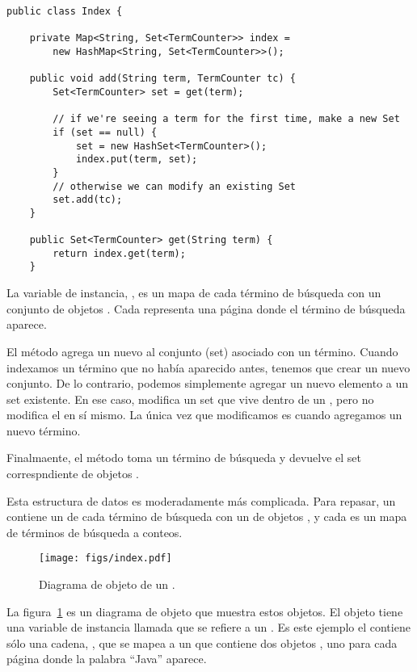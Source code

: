 \documentclass[12pt]{book}
\theoremstyle{exercise}
\begin{document}
\begin{verbatim}
public class Index {

    private Map<String, Set<TermCounter>> index = 
        new HashMap<String, Set<TermCounter>>();

    public void add(String term, TermCounter tc) {
        Set<TermCounter> set = get(term);

        // if we're seeing a term for the first time, make a new Set
        if (set == null) {
            set = new HashSet<TermCounter>();
            index.put(term, set);
        }
        // otherwise we can modify an existing Set
        set.add(tc);
    }

    public Set<TermCounter> get(String term) {
        return index.get(term);
    }
\end{verbatim}

La variable de instancia, , es un mapa de cada término de búsqueda con
un conjunto de objetos . Cada 
representa una página donde el término de búsqueda aparece.

El método  agrega un nuevo  al conjunto (set)
asociado con un término. Cuando indexamos un término que no había aparecido
antes, tenemos que crear un nuevo conjunto. De lo contrario, podemos simplemente
agregar un nuevo elemento a un set existente. En ese caso,  modifica
un set que vive dentro de un , pero no modifica el 
en sí mismo. La única vez que modificamos  es cuando agregamos un
nuevo término.

Finalmaente, el método  toma un término de búsqueda y devuelve el set
correspndiente de objetos .

Esta estructura de datos es moderadamente más complicada. Para repasar,
un  contiene un  de cada término de búsqueda con un
 de objetos , y cada 
es un mapa de términos de búsqueda a conteos.

\begin{figure}
\centering
\texttt{[image: figs/index.pdf]}
\caption{Diagrama de objeto de un .}
\label{indexfig}
\end{figure}

La figura~\ref{indexfig} es un diagrama de objeto que muestra estos
objetos.  El objeto  tiene una variable de instancia llamada
 que se refiere a un .  Es este ejemplo el
 contiene sólo una cadena, , que se mapea
a un  que contiene dos objetos ,
uno para cada página donde la palabra ``Java'' aparece.
\end{document}
